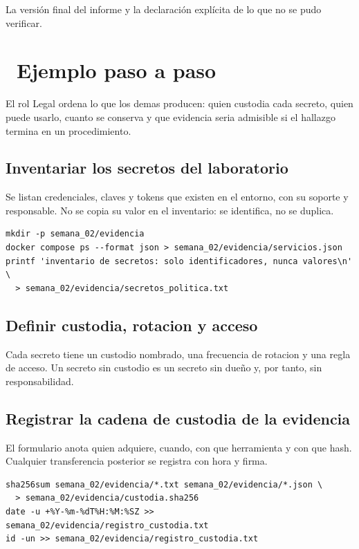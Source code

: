 \documentclass[11pt,a4paper]{article}
\newcommand{\iconotexto}[2]{\textcolor{cyanNeon}{\faIcon{#1}}~#2}
\begin{document}
La versión final del informe y la declaración explícita de lo que no se pudo verificar.

\section{\iconotexto{list-ol}{Ejemplo paso a paso}}

El rol Legal ordena lo que los demas producen: quien custodia cada secreto, quien puede usarlo, cuanto se conserva y que evidencia seria admisible si el hallazgo termina en un procedimiento.

\subsection{Inventariar los secretos del laboratorio}

Se listan credenciales, claves y tokens que existen en el entorno, con su soporte y responsable. No se copia su valor en el inventario: se identifica, no se duplica.

\begin{lstlisting}[style=estiloCodigo]
mkdir -p semana_02/evidencia
docker compose ps --format json > semana_02/evidencia/servicios.json
printf 'inventario de secretos: solo identificadores, nunca valores\n' \
  > semana_02/evidencia/secretos_politica.txt
\end{lstlisting}

\subsection{Definir custodia, rotacion y acceso}

Cada secreto tiene un custodio nombrado, una frecuencia de rotacion y una regla de acceso. Un secreto sin custodio es un secreto sin dueño y, por tanto, sin responsabilidad.

\subsection{Registrar la cadena de custodia de la evidencia}

El formulario anota quien adquiere, cuando, con que herramienta y con que hash. Cualquier transferencia posterior se registra con hora y firma.

\begin{lstlisting}[style=estiloCodigo]
sha256sum semana_02/evidencia/*.txt semana_02/evidencia/*.json \
  > semana_02/evidencia/custodia.sha256
date -u +%Y-%m-%dT%H:%M:%SZ >> semana_02/evidencia/registro_custodia.txt
id -un >> semana_02/evidencia/registro_custodia.txt
\end{lstlisting}
\end{document}

